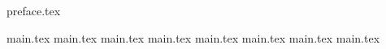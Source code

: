 \documentclass{myclass}
\begin{document}

\frontmatter

\maketitle

\tableofcontents

{preface.tex}


\mainmatter


{main.tex}
{main.tex}
{main.tex}
{main.tex}
{main.tex}
{main.tex}
{main.tex}
{main.tex}


\backmatter

\printindex
\end{document}
